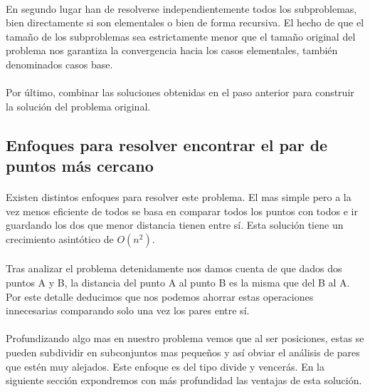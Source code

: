 \documentclass{article}
\begin{document}
		\paragraph{}
		En segundo lugar han de resolverse independientemente todos los subproblemas, bien directamente si son elementales o bien de forma recursiva. El hecho de que el tamaño de los subproblemas sea estrictamente menor que el tamaño original del problema nos garantiza la convergencia hacia los casos elementales, también denominados casos base.
		
		\paragraph{}
		Por último, combinar las soluciones obtenidas en el paso anterior para construir la solución del problema original.
		
	\subsection{Enfoques para resolver encontrar el par de puntos más cercano}


		\paragraph{}
		Existen distintos enfoques para resolver este problema. El mas simple pero a la vez menos eficiente de todos se basa en comparar todos los puntos con todos e ir guardando los dos que menor distancia tienen entre sí. Esta solución tiene un crecimiento asintótico de $O(n^2)$.

		\paragraph{}
		Tras analizar el problema detenidamente nos damos cuenta de que dados dos puntos A y B, la distancia del punto A al punto B es la misma que del B al A. Por este detalle deducimos que nos podemos ahorrar estas operaciones innecesarias comparando solo una vez los pares entre sí.
	
	
		\paragraph{}
		Profundizando algo mas en nuestro problema vemos que al ser posiciones, estas se pueden subdividir en subconjuntos mas pequeños y así obviar el análisis de pares que estén muy alejados. Este enfoque es del tipo divide y vencerás. En la siguiente sección expondremos con más profundidad las ventajas de esta solución.
\end{document}
